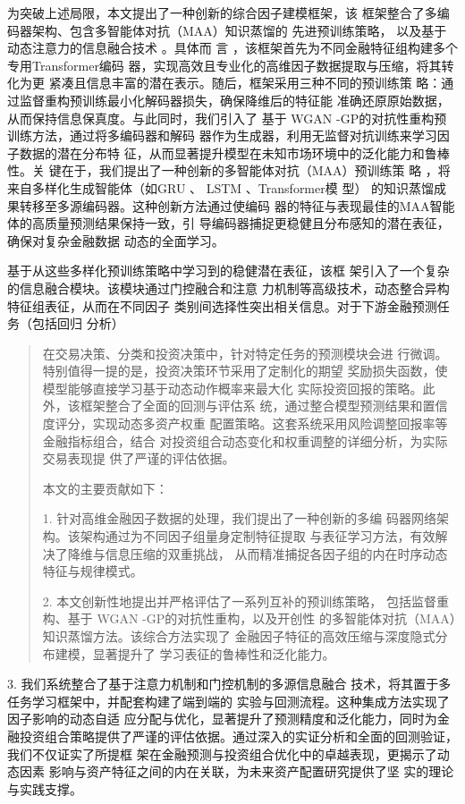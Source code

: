 为突破上述局限，本文提出了一种创新的综合因子建模框架，该
框架整合了多编码器架构、包含多智能体对抗（MAA）知识蒸馏的
先进预训练策略， 以及基于动态注意力的信息融合技术 。具体而 言
，该框架首先为不同金融特征组构建多个专用Transformer编码
器，实现高效且专业化的高维因子数据提取与压缩，将其转化为更
紧凑且信息丰富的潜在表示。随后，框架采用三种不同的预训练策
略：通过监督重构预训练最小化解码器损失，确保降维后的特征能
准确还原原始数据，从而保持信息保真度。与此同时，我们引入了 基于 WGAN
-GP的对抗性重构预训练方法，通过将多编码器和解码
器作为生成器，利用无监督对抗训练来学习因子数据的潜在分布特
征，从而显著提升模型在未知市场环境中的泛化能力和鲁棒性。关
键在于，我们提出了一种创新的多智能体对抗（MAA）预训练策 略
，将来自多样化生成智能体（如GRU 、 LSTM 、Transformer模 型）
的知识蒸馏成果转移至多源编码器。这种创新方法通过使编码
器的特征与表现最佳的MAA智能体的高质量预测结果保持一致，引
导编码器捕捉更稳健且分布感知的潜在表征，确保对复杂金融数据
动态的全面学习。

基于从这些多样化预训练策略中学习到的稳健潜在表征，该框
架引入了一个复杂的信息融合模块。该模块通过门控融合和注意
力机制等高级技术，动态整合异构特征组表征，从而在不同因子
类别间选择性突出相关信息。对于下游金融预测任务（包括回归 分析）

\begin{quote}
在交易决策、分类和投资决策中，针对特定任务的预测模块会进
行微调。特别值得一提的是，投资决策环节采用了定制化的期望
奖励损失函数，使模型能够直接学习基于动态动作概率来最大化
实际投资回报的策略。此外，该框架整合了全面的回测与评估系
统，通过整合模型预测结果和置信度评分，实现动态多资产权重
配置策略。这套系统采用风险调整回报率等金融指标组合，结合
对投资组合动态变化和权重调整的详细分析，为实际交易表现提
供了严谨的评估依据。

本文的主要贡献如下：

1. 针对高维金融因子数据的处理，我们提出了一种创新的多编
码器网络架构。该架构通过为不同因子组量身定制特征提取
与表征学习方法，有效解决了降维与信息压缩的双重挑战，
从而精准捕捉各因子组的内在时序动态特征与规律模式。

2. 本文创新性地提出并严格评估了一系列互补的预训练策略，
包括监督重构、基于 WGAN -GP的对抗性重构，以及开创性
的多智能体对抗（MAA）知识蒸馏方法。该综合方法实现了
金融因子特征的高效压缩与深度隐式分布建模，显著提升了
学习表征的鲁棒性和泛化能力。
\end{quote}

3. 我们系统整合了基于注意力机制和门控机制的多源信息融合
技术，将其置于多任务学习框架中，并配套构建了端到端的
实验与回测流程。这种集成方法实现了因子影响的动态自适
应分配与优化，显著提升了预测精度和泛化能力，同时为金
融投资组合策略提供了严谨的评估依据。通过深入的实证分析和全面的回测验证，我们不仅证实了所提框
架在金融预测与投资组合优化中的卓越表现，更揭示了动态因素
影响与资产特征之间的内在关联，为未来资产配置研究提供了坚
实的理论与实践支撑。

